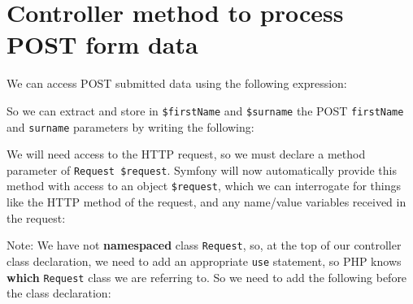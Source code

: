 \documentclass[a4paperpaper,openright]{book}
\newenvironment{Shaded}{}{}
\newcommand{\KeywordTok}[1]{\textcolor[rgb]{0.00,0.44,0.13}{\textbf{#1}}}
\newcommand{\NormalTok}[1]{#1}
\newcommand{\OtherTok}[1]{\textcolor[rgb]{0.00,0.44,0.13}{#1}}
\newcommand{\StringTok}[1]{\textcolor[rgb]{0.25,0.44,0.63}{#1}}
\begin{document}
\hypertarget{controller-method-to-process-post-form-data}{%
\section{Controller method to process POST form
data}\label{controller-method-to-process-post-form-data}}

We can access POST submitted data using the following expression:

\begin{Shaded}
\end{Shaded}

So we can extract and store in \texttt{\$firstName} and
\texttt{\$surname} the POST \texttt{firstName} and \texttt{surname}
parameters by writing the following:

\begin{Shaded}
\end{Shaded}

We will need access to the HTTP request, so we must declare a method
parameter of \texttt{Request\ \$request}. Symfony will now automatically
provide this method with access to an object \texttt{\$request}, which
we can interrogate for things like the HTTP method of the request, and
any name/value variables received in the request:

\begin{Shaded}
\end{Shaded}

Note: We have not \textbf{namespaced} class \texttt{Request}, so, at the
top of our controller class declaration, we need to add an appropriate
\texttt{use} statement, so PHP knows \textbf{which} \texttt{Request}
class we are referring to. So we need to add the following before the
class declaration:
\end{document}
